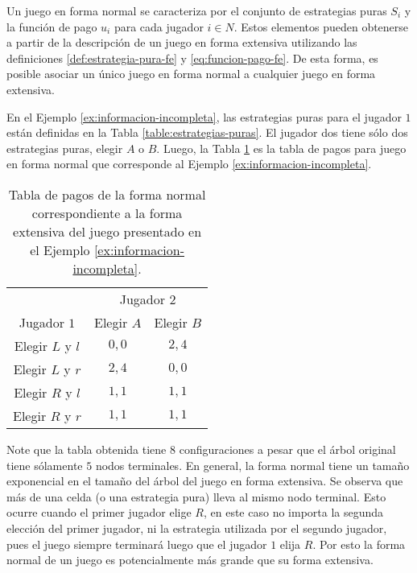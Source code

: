 Un juego en forma normal %
se caracteriza por el conjunto de estrategias puras $S_i$ y la función de pago $u_i$ para cada jugador $i\in N$. Estos elementos pueden obtenerse a partir de la descripción de un juego en forma extensiva utilizando las definiciones \ref{def:estrategia-pura-fe} y \ref{eq:funcion-pago-fe}. De esta forma, es posible asociar un único juego en forma normal a cualquier juego en forma extensiva.

En el Ejemplo \ref{ex:informacion-incompleta}, las estrategias puras para el jugador $1$ están definidas en la Tabla \ref{table:estrategias-puras}. El jugador dos tiene sólo dos estrategias puras, elegir $A$ o $B$. Luego, la Tabla \ref{table:fextensiva-a-fnormal} es la tabla de pagos para juego en forma normal que corresponde al Ejemplo \ref{ex:informacion-incompleta}.

\begin{table}[ht]
\begin{center}
\caption[Forma normal de un juego en forma extensiva]{Tabla de pagos de la forma normal correspondiente a la forma extensiva del juego presentado en el Ejemplo \ref{ex:informacion-incompleta}.}
\label{table:fextensiva-a-fnormal}
\begin{tabular}{ c | c  c }
\hline
\multicolumn{1}{c}{} & \multicolumn{2}{|c}{Jugador $2$} \\ 
Jugador $1$ & \multicolumn{1}{c}{ Elegir $A$ } & Elegir $B$ \\ \hline
Elegir $L$ y $l$ & $0,0$ & $2,4$ \\
Elegir $L$ y $r$ & $2,4$ & $0,0$ \\
Elegir $R$ y $l$ & $1,1$ & $1,1$ \\
Elegir $R$ y $r$ & $1,1$ & $1,1$ \\ \hline
\end{tabular}
\end{center}
\end{table}

Note que la tabla obtenida tiene $8$ configuraciones a pesar que el árbol original tiene sólamente $5$ nodos terminales. En general, la forma normal tiene un tamaño exponencial en el tamaño del árbol del juego en forma extensiva. Se observa que más de una celda (o una estrategia pura) lleva al mismo nodo terminal. Esto ocurre cuando el primer jugador elige $R$, en este caso no importa la segunda elección del primer jugador, ni la estrategia utilizada por el segundo jugador, pues el juego siempre terminará luego que el jugador $1$ elija $R$. Por esto la forma normal de un juego es potencialmente más grande que su forma extensiva.


